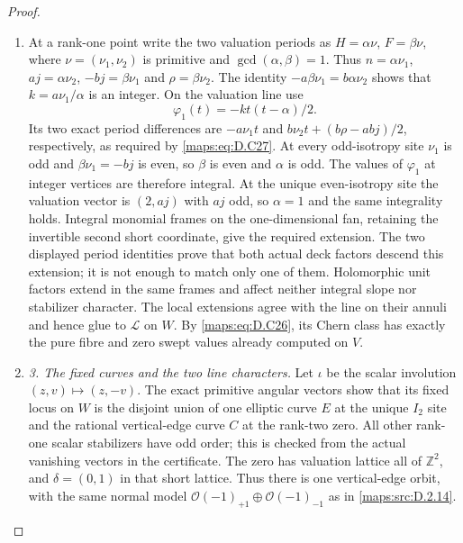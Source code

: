\begin{proof}
\begin{enumerate}[label=\arabic*.,leftmargin=*]
\item At a rank-one point write the two valuation periods as
$H=\alpha\nu$, $F=\beta\nu$, where
$\nu=(\nu_1,\nu_2)$ is primitive and
$\gcd(\alpha,\beta)=1$. Thus
$n=\alpha\nu_1$, $aj=\alpha\nu_2$,
$-bj=\beta\nu_1$ and $\rho=\beta\nu_2$.
The identity $-a\beta\nu_1=b\alpha\nu_2$ shows that
$k=a\nu_1/\alpha$ is an integer. On the valuation line use
\[
             \varphi_1(t)=-k t(t-\alpha)/2.
\]
Its two exact period differences are
$-a\nu_1t$ and
$b\nu_2t+(b\rho-abj)/2$, respectively, as required by
\eqref{maps:eq:D.C27}. At every odd-isotropy site $\nu_1$ is odd and
$\beta\nu_1=-bj$ is even, so $\beta$ is even and $\alpha$
is odd. The values of $\varphi_1$ at integer vertices are therefore
integral. At the unique even-isotropy site the valuation vector is
$(2,aj)$ with $aj$ odd, so $\alpha=1$ and the same integrality
holds. Integral monomial frames on the one-dimensional fan, retaining
the invertible second short coordinate, give the required extension.
The two displayed period identities prove that both actual deck
factors descend this extension; it is not enough to match only one
of them.
Holomorphic unit factors extend in the same frames and affect neither
integral slope nor stabilizer character. The local extensions agree
with the line on their annuli and hence glue to $\mathcal L$ on $W$.
By \eqref{maps:eq:D.C26}, its Chern class has exactly the pure fibre and zero swept
values already computed on $V$.

\item \emph{3. The fixed curves and the two line characters.}
Let $\iota$ be the scalar involution $(z,v)\mapsto(z,-v)$.
The exact primitive angular vectors show that its fixed locus on $W$
is the disjoint union of one elliptic curve $E$ at the unique $I_2$
site and the rational vertical-edge curve $C$ at the rank-two zero.
All other rank-one scalar stabilizers have odd order; this is checked
from the actual vanishing vectors in the certificate. The zero has
valuation lattice all of $\mathbb Z^2$, and $\delta=(0,1)$ in that
short lattice. Thus there is one vertical-edge orbit, with the same
normal model
$\mathcal O(-1)_{+1}\oplus\mathcal O(-1)_{-1}$ as in \ref{maps:src:D.2.14}.


\end{enumerate}
\end{proof}
